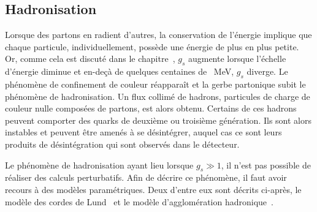 \subsection{Hadronisation}\label{chapter-JERC-section-jets-subsec-hadronisation}
Lorsque des partons en radient d'autres, la conservation de l'énergie implique que chaque particule, individuellement, possède une énergie de plus en plus petite.
Or, comme cela est discuté dans le chapitre~, $g_s$ augmente lorsque l'échelle d'énergie diminue et en-deçà de quelques centaines de \SI{}{\MeV}, $g_s$ diverge.
Le phénomène de confinement de couleur réapparaît et la gerbe partonique subit le phénomène de hadronisation.
Un flux collimé de hadrons, particules de charge de couleur nulle composées de partons, est alors obtenu.
Certains de ces hadrons peuvent comporter des quarks de deuxième ou troisième génération. Ils sont alors instables et peuvent être amenés à se désintégrer, auquel cas ce sont leurs produits de désintégration qui sont observés dans le détecteur.
\par Le phénomène de hadronisation ayant lieu lorsque $g_s\gg1$, il n'est pas possible de réaliser des calculs perturbatifs. Afin de décrire ce phénomène, il faut avoir recours à des modèles paramétriques. Deux d'entre eux sont décrits ci-après, le modèle des cordes de Lund~\cite{Andersson_parton_fragmentation} et le modèle d'agglomération hadronique~\cite{Winter_2004}.
